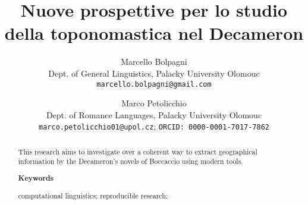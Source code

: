 \documentclass[11pt,a4paper, oneside]{article}
\title{Nuove prospettive per lo studio della toponomastica nel Decameron}
\author{
  Marcello Bolpagni\\
  Dept. of General Linguistics, Palacky University Olomouc \\
  \texttt{marcello.bolpagni@gmail.com}
  \and
  Marco Petolicchio\\
  Dept. of Romance Languages, Palacky University Olomouc\\
  \texttt{marco.petolicchio01@upol.cz};
  \texttt{ORCID: 0000-0001-7017-7862}\\
}
\begin{document}
\maketitle

\begin{abstract}

This research aims to investigate over a coherent way to extract geographical information by the Decameron’s novels of Boccaccio using modern tools.

\textbf{Keywords}

computational linguistics; reproducible research; 

\end{abstract}


\tableofcontents
\newpage

\newpage
\printbibliography
\end{document}
